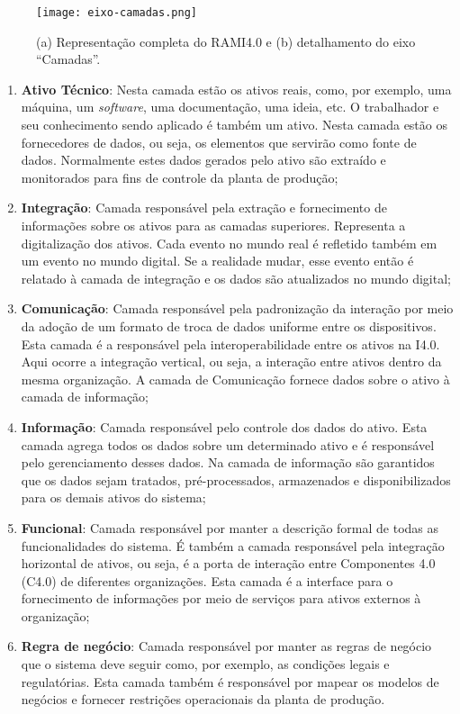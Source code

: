 \begin{figure}[htb]
	\centering
	\texttt{[image: eixo-camadas.png]}
	\caption{(a) Representação completa do RAMI4.0 e (b) detalhamento do eixo ``Camadas''.}
	\label{fig:eixo-camadas}
\end{figure}

\begin{enumerate}
	\item \textbf{Ativo Técnico}: Nesta camada estão os ativos reais, como, por exemplo, uma máquina, um \textit{software}, uma documentação, uma ideia, etc. O trabalhador e seu conhecimento sendo aplicado é também um ativo. Nesta camada estão os fornecedores de dados, ou seja, os elementos que servirão como fonte de dados. Normalmente estes dados gerados pelo ativo são extraído e monitorados para fins de controle da planta de produção;

	\item \textbf{Integração}: Camada responsável pela extração e fornecimento de informações sobre os ativos para as camadas superiores. Representa a digitalização dos ativos. Cada evento no mundo real é refletido também em um evento no mundo digital. Se a realidade mudar, esse evento então é relatado à camada de integração e os dados são atualizados no mundo digital;

	\item \textbf{Comunicação}: Camada responsável pela padronização da interação por meio da adoção de um formato de troca de dados uniforme entre os dispositivos. Esta camada é a responsável pela interoperabilidade entre os ativos na I4.0. Aqui ocorre a integração vertical, ou seja, a interação entre ativos dentro da mesma organização. A camada de Comunicação fornece dados sobre o ativo à camada de informação;

	\item \textbf{Informação}: Camada responsável pelo controle dos dados do ativo. Esta camada agrega todos os dados sobre um determinado ativo e é responsável pelo gerenciamento desses dados. Na camada de informação são garantidos que os dados sejam tratados, pré-processados, armazenados e disponibilizados para os demais ativos do sistema;

	\item \textbf{Funcional}: Camada responsável por manter a descrição formal de todas as funcionalidades do sistema. É também a camada responsável pela integração horizontal de ativos, ou seja, é a porta de interação entre Componentes 4.0 (C4.0) de diferentes organizações. Esta camada é a interface para o fornecimento de informações por meio de serviços para ativos externos à organização;

	\item \textbf{Regra de negócio}: Camada responsável por manter as regras de negócio que o sistema deve seguir como, por exemplo, as condições legais e regulatórias. Esta camada também é responsável por mapear os modelos de negócios e fornecer restrições operacionais da planta de produção.
\end{enumerate}


